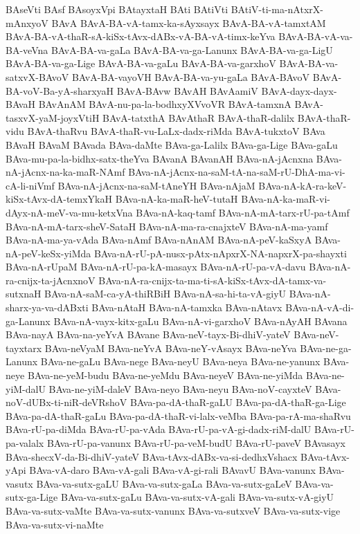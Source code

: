 {BAseVti
BAsf
BAsoyxVpi
BAtayxtaH
BAti
BAtiVti
BAtiV-ti-ma-nAtxrX-mAnxyoV
BAvA
BAvA-BA-vA-tamx-ka-sAyxsayx
BAvA-BA-vA-tamxtAM
BAvA-BA-vA-thaR-sA-kiSx-tAvx-dABx-vA-BA-vA-timx-keYva
BAvA-BA-vA-va-BA-veVna
BAvA-BA-va-gaLa
BAvA-BA-va-ga-Lanunx
BAvA-BA-va-ga-LigU
BAvA-BA-va-ga-Lige
BAvA-BA-va-gaLu
BAvA-BA-va-garxhoV
BAvA-BA-va-satxvX-BAvoV
BAvA-BA-vayoVH
BAvA-BA-va-yu-gaLa
BAvA-BAvoV
BAvA-BA-voV-Ba-yA-sharxyaH
BAvA-BAvw
BAvAH
BAvAamiV
BAvA-dayx-dayx-BAvaH
BAvAnAM
BAvA-nu-pa-la-bodhxyXVvoVR
BAvA-tamxnA
BAvA-tasxvX-yaM-joyxVtiH
BAvA-tatxthA
BAvAthaR
BAvA-thaR-dalilx
BAvA-thaR-vidu
BAvA-thaRvu
BAvA-thaR-vu-LaLx-dadx-riMda
BAvA-tukxtoV
BAva
BAvaH
BAvaM
BAvada
BAva-daMte
BAva-ga-Lalilx
BAva-ga-Lige
BAva-gaLu
BAva-mu-pa-la-bidhx-satx-theYva
BAvanA
BAvanAH
BAva-nA-jAcnxna
BAva-nA-jAcnx-na-ka-maR-NAmf
BAva-nA-jAcnx-na-saM-tA-na-saM-rU-DhA-ma-vi-cA-li-niVmf
BAva-nA-jAcnx-na-saM-tAneYH
BAva-nAjaM
BAva-nA-kA-ra-keV-kiSx-tAvx-dA-temxYkaH
BAva-nA-ka-maR-heV-tutaH
BAva-nA-ka-maR-vi-dAyx-nA-meV-va-mu-ketxVna
BAva-nA-kaq-tamf
BAva-nA-mA-tarx-rU-pa-tAmf
BAva-nA-mA-tarx-sheV-SataH
BAva-nA-ma-ra-cnajxteV
BAva-nA-ma-yamf
BAva-nA-ma-ya-vAda
BAva-nAmf
BAva-nAnAM
BAva-nA-peV-kaSxyA
BAva-nA-peV-keSx-yiMda
BAva-nA-rU-pA-nusx-pAtx-nApxrX-NA-napxrX-pa-shayxti
BAva-nA-rUpaM
BAva-nA-rU-pa-kA-masayx
BAva-nA-rU-pa-vA-davu
BAva-nA-ra-cnijx-ta-jAcnxnoV
BAva-nA-ra-cnijx-ta-ma-ti-sA-kiSx-tAvx-dA-tamx-va-sutxnaH
BAva-nA-saM-ca-yA-thiRBiH
BAva-nA-sa-hi-ta-vA-giyU
BAva-nA-sharx-ya-va-dABxti
BAva-nAtaH
BAva-nA-tamxka
BAva-nAtavx
BAva-nA-vA-di-ga-Lanunx
BAva-nA-vayx-kitx-gaLu
BAva-nA-vi-garxhoV
BAva-nAyAH
BAvana
BAva-nayA
BAva-na-yeYvA
BAvane
BAva-neV-tayx-Bi-dhiV-yateV
BAva-neV-tayxtarx
BAva-neVyaM
BAva-neYvA
BAva-neY-vAsayx
BAva-neYva
BAva-ne-ga-Lanunx
BAva-ne-gaLu
BAva-nege
BAva-neyU
BAva-neya
BAva-ne-yanunx
BAva-neye
BAva-ne-yeM-budu
BAva-ne-yeMdu
BAva-neyeV
BAva-ne-yiMda
BAva-ne-yiM-dalU
BAva-ne-yiM-daleV
BAva-neyo
BAva-neyu
BAva-noV-cayxteV
BAva-noV-dUBx-ti-niR-deVRshoV
BAva-pa-dA-thaR-gaLU
BAva-pa-dA-thaR-ga-Lige
BAva-pa-dA-thaR-gaLu
BAva-pa-dA-thaR-vi-lalx-veMba
BAva-pa-rA-ma-shaRvu
BAva-rU-pa-diMda
BAva-rU-pa-vAda
BAva-rU-pa-vA-gi-dadx-riM-dalU
BAva-rU-pa-valalx
BAva-rU-pa-vanunx
BAva-rU-pa-veM-budU
BAva-rU-paveV
BAvasayx
BAva-shecxV-da-Bi-dhiV-yateV
BAva-tAvx-dABx-va-si-dedhxVshacx
BAva-tAvx-yApi
BAva-vA-daro
BAva-vA-gali
BAva-vA-gi-rali
BAvavU
BAva-vanunx
BAva-vasutx
BAva-va-sutx-gaLU
BAva-va-sutx-gaLa
BAva-va-sutx-gaLeV
BAva-va-sutx-ga-Lige
BAva-va-sutx-gaLu
BAva-va-sutx-vA-gali
BAva-va-sutx-vA-giyU
BAva-va-sutx-vaMte
BAva-va-sutx-vanunx
BAva-va-sutxveV
BAva-va-sutx-vige
BAva-va-sutx-vi-naMte
}
